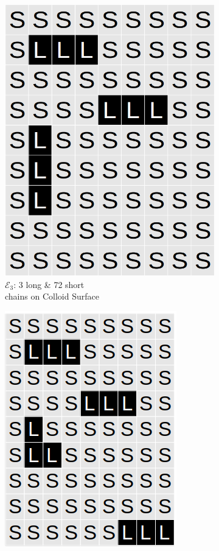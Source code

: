 \documentclass[journal=mamobx,manuscript=article]{achemso}
\begin{document}
\begin{figure}[H]
\begin{subfigure}[b]{0.4\textwidth}
        \includegraphics[scale=0.15]{fig8d.png}
        \caption{$\mathcal{E}_3$:  3 long \& 72 short \\chains on Colloid Surface}
        \label{fig:D}
    \end{subfigure}
    \begin{subfigure}[b]{0.4\textwidth}
        \includegraphics[scale=0.315]{rightangleL.png}

\end{subfigure}
\end{figure}
\end{document}
